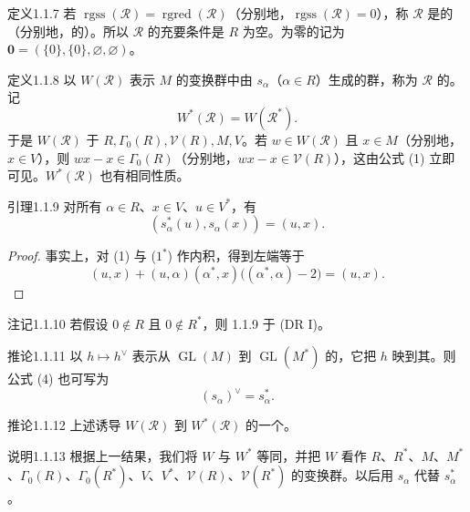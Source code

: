 \begin{SGAresult}{定义}{1.1.7}
若 $\operatorname{rgss}(\mathscr R)=\operatorname{rgred}(\mathscr R)$（分别地，$\operatorname{rgss}(\mathscr R)=0$），称 $\mathscr R$ 是的（分别地，的）。所以 $\mathscr R$ 的充要条件是 $R$ 为空。为零的记为 $\mathbf0=(\{0\},\{0\},\varnothing,\varnothing)$。
\end{SGAresult}

\begin{SGAresult}{定义}{1.1.8}
以 $W(\mathscr R)$ 表示 $M$ 的变换群中由 $s_\alpha$（$\alpha\in R$）生成的群，称为 $\mathscr R$ 的。记
\[W^*(\mathscr R)=W(\mathscr R^*).\]
于是 $W(\mathscr R)$ 于 $R,\Gamma_0(R),\mathscr V(R),M,V$。若 $w\in W(\mathscr R)$ 且 $x\in M$（分别地，$x\in V$），则 $wx-x\in\Gamma_0(R)$（分别地，$wx-x\in\mathscr V(R)$），这由公式 (1) 立即可见。$W^*(\mathscr R)$ 也有相同性质。
\end{SGAresult}
\begin{SGAresult}{引理}{1.1.9}
对所有 $\alpha\in R$、$x\in V$、$u\in V^*$，有
\[(s_\alpha^*(u),s_\alpha(x))=(u,x).\tag{4}\]
\end{SGAresult}
\begin{proof}
事实上，对 (1) 与 ($1^*$) 作内积，得到左端等于
\[(u,x)+(u,\alpha)(\alpha^*,x)\bigl((\alpha^*,\alpha)-2\bigr)=(u,x).\]
\end{proof}
\begin{SGAresult}{注记}{1.1.10}
若假设 $0\notin R$ 且 $0\notin R^*$，则 1.1.9 于 (DR I)。
\end{SGAresult}
\begin{SGAresult}{推论}{1.1.11}
以 $h\mapsto h^\vee$ 表示从 $\operatorname{GL}(M)$ 到 $\operatorname{GL}(M^*)$ 的，它把 $h$ 映到其。则公式 (4) 也可写为
\[(s_\alpha)^\vee=s_\alpha^*.\tag{5}\]
\end{SGAresult}
\begin{SGAresult}{推论}{1.1.12}
上述诱导 $W(\mathscr R)$ 到 $W^*(\mathscr R)$ 的一个。
\end{SGAresult}
\begin{SGAresult}{说明}{1.1.13}
根据上一结果，我们将 $W$ 与 $W^*$ 等同，并把 $W$ 看作 $R$、$R^*$、$M$、$M^*$、$\Gamma_0(R)$、$\Gamma_0(R^*)$、$V$、$V^*$、$\mathscr V(R)$、$\mathscr V(R^*)$ 的变换群。以后用 $s_\alpha$ 代替 $s_\alpha^*$。
\end{SGAresult}
